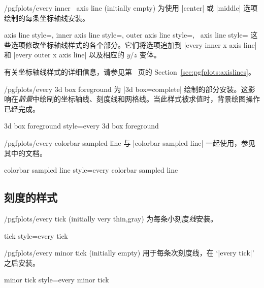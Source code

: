 \begin{xystylekey}{/pgfplots/every inner \x\ axis line (initially empty)}
    为使用 |center| 或 |middle| 选项绘制的每条坐标轴线安装。
\end{xystylekey}

\begin{pgfplotsxykeylist}{%
    axis line style=,
    inner axis line style=,
    outer axis line style=,
    \x\ axis line style=%
}
    这些选项修改坐标轴线样式的各个部分。它们将选项追加到 |every inner x axis line| 和 |every outer x axis line| 以及相应的 $y$/$z$ 变体。
\end{pgfplotsxykeylist}

\noindent 有关坐标轴线样式的详细信息，请参见第~\pageref{pgfplots:page:axislines} 页的 Section~\ref{sec:pgfplots:axislines}。

\begin{stylekey}{/pgfplots/every 3d box foreground}
    为 |3d box=complete| 绘制的部分安装。这影响在\emph{前景}中绘制的坐标轴线、刻度线和网格线。当此样式被求值时，背景绘图操作已经完成。
\end{stylekey}

\pgfplotsshortstylekey 3d box foreground style=every 3d box foreground\pgfeov

\begin{stylekey}{/pgfplots/every colorbar sampled line}
    与 |colorbar sampled line| 一起使用，参见其中的文档。
\end{stylekey}

\pgfplotsshortstylekey colorbar sampled line style=every colorbar sampled line\pgfeov


\subsection*{刻度的样式}

\begin{stylekey}{/pgfplots/every tick (initially very thin,gray)}
    为每条小刻度\emph{线}安装。
\end{stylekey}

\pgfplotsshortstylekey tick style=every tick\pgfeov

\begin{stylekey}{/pgfplots/every minor tick (initially empty)}
    用于每条次刻度线，在 `|every tick|' 之后安装。
\end{stylekey}

\pgfplotsshortstylekey minor tick style=every minor tick\pgfeov

